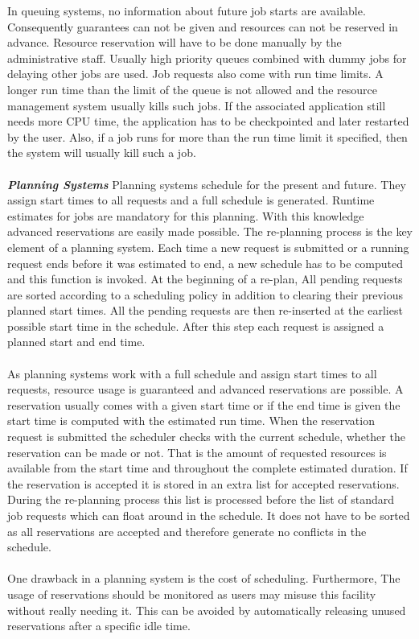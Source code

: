In queuing systems, no information about future job starts are available. Consequently guarantees can not be given and resources can not be reserved in advance. Resource reservation will have to be done manually by the administrative staff. Usually high priority queues combined with dummy jobs for delaying other jobs are used. Job requests also come with run time limits. A longer run time than the limit of the queue is not allowed and the resource management system usually kills such jobs. If the associated application still needs more CPU time, the application has to be checkpointed and later restarted by the user. Also, if a job runs for more than the run time limit it specified, then the system will usually kill such a job.\\ \\
\textbf{\textit{Planning Systems }}Planning systems schedule for the present and future. They assign start times to all requests and a full schedule is generated. Runtime estimates for jobs are mandatory for this planning. With this knowledge advanced reservations are easily made possible. The re-planning process is the key element of a planning system. Each time a new request is submitted or a running request ends before it was estimated to end, a new schedule has to be computed and this function is invoked. At the beginning of a re-plan, All pending requests are sorted according to a scheduling policy in addition to clearing their previous planned start times. All the pending requests are then re-inserted at the earliest possible start time in the schedule. After this step each request is assigned a planned start and end time.\\ \\
As planning systems work with a full schedule and assign start times to all requests, resource usage is guaranteed and advanced reservations are possible. A reservation usually comes with a given start time or if the end time is given the start time is computed with the estimated run time. When the reservation request is submitted the scheduler checks with the current schedule, whether the reservation can be made or not. That is the amount of requested resources is available from the start time and throughout the complete estimated duration. If the reservation is accepted it is stored in an extra list for accepted reservations. During the re-planning process this list is processed before the list of standard job requests which can float around in the schedule. It does not have to be sorted as all reservations are accepted and therefore generate no conflicts in the schedule.\\ \\
One drawback in a planning system is the cost of scheduling. Furthermore, The usage of reservations should be monitored as users may misuse this facility without really needing it. This can be avoided by automatically releasing unused reservations after a specific idle time.
